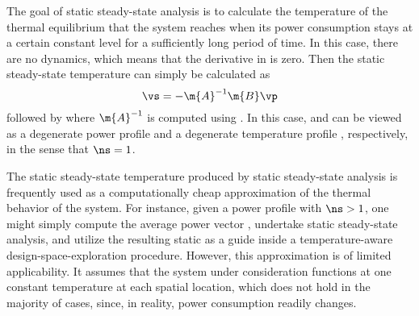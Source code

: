 The goal of static steady-state analysis is to calculate the temperature of the
thermal equilibrium that the system reaches when its power consumption stays at
a certain constant level \vp for a sufficiently long period of time. In this
case, there are no dynamics, which means that the derivative in
 is zero. Then the static steady-state
temperature \vq can simply be calculated as
\[
  \vs = -\m{A}^{-1} \m{B} \vp
\]
followed by  where $\m{A}^{-1}$ is computed using
. In this case, \vp and \vq can be viewed as a degenerate
power profile \mp and a degenerate temperature profile \mq, respectively, in the
sense that $\ns = 1$.

The static steady-state temperature produced by static steady-state analysis is
frequently used as a computationally cheap approximation of the thermal behavior
of the system. For instance, given a power profile \mp with $\ns > 1$, one might
simply compute the average power vector \vp, undertake static steady-state
analysis, and utilize the resulting static \vq as a guide inside a
temperature-aware design-space-exploration procedure. However, this
approximation is of limited applicability. It assumes that the system under
consideration functions at one constant temperature at each spatial location,
which does not hold in the majority of cases, since, in reality, power
consumption readily changes.
